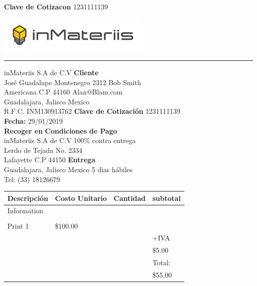 \documentclass[12pt]{report}
\begin{document}
\begin{flushright} \textbf{Clave de Cotizacon} 1231111139\end{flushright}
\includegraphics[width=20em]{inmats.jpg}
\hrule
\vspace{1cm}
 
{\noindent
inMateriis S.A de C.V \hfill \textbf{Cliente} \hspace{10em} \\
Jos\'e Guadalupe Montenegro 2312 \hfill Bob Smith\hspace{8.5em} \\
Americana C.P 44160 \hfill Alan@Blam.com\hspace{8em} \\
Guadalajara, Jalisco Mexico \\
 
\noindent
R.F.C. INM130913762 \hfill \textbf{Clave de Cotizaci\'on} 1231111139 \\
\textbf{Fecha:} 29/01/2019 \\
 
\noindent
\textbf{Recoger en}  \hfill \textbf{Condiciones de Pago} \hspace{4em} \\
inMateriis S.A de C.V  \hfill 100\% contra entrega \hspace{5.5em} \\
Lerdo de Tejada No. 2334 \\
Lafayette C.P 44150  \hfill \textbf{Entrega} \hspace{10.5em} \\
Guadalajara, Jalisco Mexico   \hfill 5 dias h\'abiles \hspace{8.5em} \\
Tel: (33) 18126679\\
\begin{center}
\begin{large}
\begin{tabular}{| >{\centering\arraybackslash}m{3cm} | >{\centering\arraybackslash}m{4cm} | >{\centering\arraybackslash}m{2cm} |  >{\centering\arraybackslash}m{4cm}|} 
\hline
Descripci\'on & Costo Unitario & Cantidad & subtotal \\
\hline
Information & & &\\
& & &\\ 
Print 1 & \$100.00 &1 &  \\& & & +IVA \\ 
& & & \$5.00\\ 
& & & Total: \\ 
& & & \$55.00\\ 
 \hline
 \end{tabular}
 \end{large}
 

\end{center}}
\end{document}
